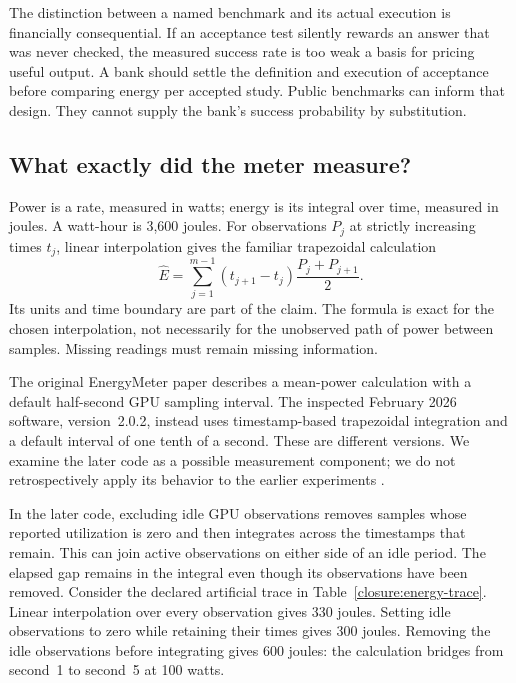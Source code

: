 The distinction between a named benchmark and its actual execution is
financially consequential. If an acceptance test silently rewards an answer
that was never checked, the measured success rate is too weak a basis for
pricing useful output. A bank should settle the definition and execution of
acceptance before comparing energy per accepted study. Public benchmarks
can inform that design. They cannot supply the bank's success probability
by substitution.

\subsection{What exactly did the meter measure?}

Power is a rate, measured in watts; energy is its integral over time,
measured in joules. A watt-hour is 3,600 joules. For observations $P_j$ at
strictly increasing times $t_j$, linear interpolation gives the familiar
trapezoidal calculation
\begin{equation}
 \widehat E=\sum_{j=1}^{m-1}
        (t_{j+1}-t_j)\frac{P_j+P_{j+1}}2.
 \label{closure:energy-trapezoid}
\end{equation}
Its units and time boundary are part of the claim. The formula is exact for
the chosen interpolation, not necessarily for the unobserved path of power
between samples. Missing readings must remain missing information.

The original EnergyMeter paper describes a mean-power calculation with a
default half-second GPU sampling interval. The inspected February 2026
software, version~2.0.2, instead uses timestamp-based trapezoidal integration
and a default interval of one tenth of a second. These are different
versions. We examine the later code as a possible measurement component;
we do not retrospectively apply its behavior to the earlier experiments
\citep{closureEnergyMeter2026}.

In the later code, excluding idle GPU observations removes samples whose
reported utilization is zero and then integrates across the timestamps that
remain. This can join active observations on either side of an idle period.
The elapsed gap remains in the integral even though its observations have
been removed. Consider the declared artificial trace in
Table~\ref{closure:energy-trace}. Linear interpolation over every observation
gives 330 joules. Setting idle observations to zero while retaining their
times gives 300 joules. Removing the idle observations before integrating
gives 600 joules: the calculation bridges from second~1 to second~5 at
100 watts.

